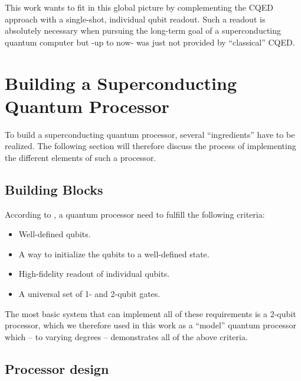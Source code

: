 This work wants to fit in this global picture by complementing the CQED approach with a single-shot, individual qubit readout. Such a readout is absolutely necessary when pursuing the long-term goal of a superconducting quantum computer but -up to now- was just not provided by ``classical'' CQED.

\section{Building a Superconducting Quantum Processor}

To build a superconducting quantum processor, several ``ingredients'' have to be realized. The following section will therefore discuss the process of implementing the different elements of such a processor.

\subsection{Building Blocks}

According to \cite{divincenzo_physical_2000}, a quantum processor need to fulfill the following criteria:

\begin{itemize}
\item Well-defined qubits.
\item A way to initialize the qubits to a well-defined state.
\item High-fidelity readout of individual qubits.
\item A universal set of 1- and 2-qubit gates.
\end{itemize}

The most basic system that can implement all of these requirements is a 2-qubit processor, which we therefore used in this work as a ``model'' quantum processor which -- to varying degrees -- demonstrates all of the above criteria.

\subsection{Processor design}

